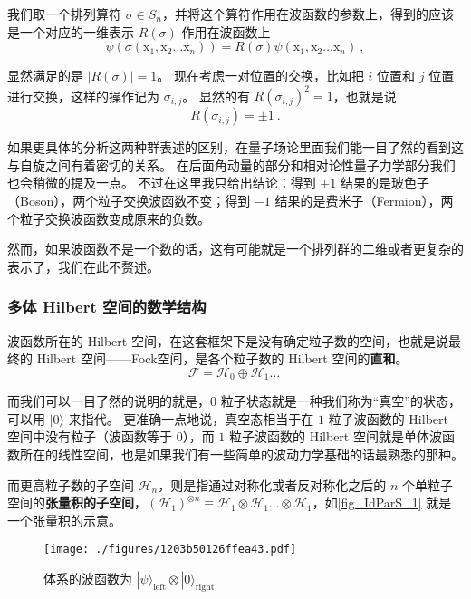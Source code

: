 我们取一个排列算符 $\sigma\in S_n$，并将这个算符作用在波函数的参数上，得到的应该是一个对应的一维表示 $R(\sigma)$ 作用在波函数上
\begin{equation}
\psi(\sigma ({\mathrm x}_1, {\mathrm x}_2\dots{\mathrm x}_n)) = R(\sigma)\psi({\mathrm x}_1, {\mathrm x}_2\dots{\mathrm x}_n)~,
\end{equation}

显然满足的是 $|R(\sigma)| = 1$。 现在考虑一对位置的交换，比如把 $i$ 位置和 $j$ 位置进行交换，这样的操作记为 $\sigma_{i,j}$。 显然的有 $R(\sigma_{i,j})^2 = 1$，也就是说
\begin{equation}
R(\sigma_{i,j}) = \pm 1~.
\end{equation}

如果更具体的分析这两种群表述的区别，在量子场论里面我们能一目了然的看到这与自旋之间有着密切的关系。 在后面角动量的部分和相对论性量子力学部分我们也会稍微的提及一点。 不过在这里我只给出结论：得到 $+1$ 结果的是玻色子（Boson），两个粒子交换波函数不变；得到 $-1$ 结果的是费米子（Fermion），两个粒子交换波函数变成原来的负数。

然而，如果波函数不是一个数的话，这有可能就是一个排列群的二维或者更复杂的表示了，我们在此不赘述。

\subsubsection{多体 Hilbert 空间的数学结构}

波函数所在的 Hilbert 空间，在这套框架下是没有确定粒子数的空间，也就是说最终的 Hilbert 空间——Fock空间，是各个粒子数的 Hilbert 空间的\textbf{直和}。
\begin{equation}
\mathcal{F} = \mathcal{H}_0 \oplus \mathcal{H}_1\dots~
\end{equation}

而我们可以一目了然的说明的就是，$0$ 粒子状态就是一种我们称为“真空”的状态，可以用 $|0\rangle$ 来指代。 更准确一点地说，真空态相当于在 $1$ 粒子波函数的 Hilbert 空间中没有粒子（波函数等于 $0$），而 $1$ 粒子波函数的 Hilbert 空间就是单体波函数所在的线性空间，也是如果我们有一些简单的波动力学基础的话最熟悉的那种。

而更高粒子数的子空间 $\mathcal{H}_n$，则是指通过对称化或者反对称化之后的 $n$ 个单粒子空间的\textbf{张量积的子空间}，$(\mathcal{H}_1)^{\otimes n} \equiv \mathcal{H}_1\otimes \mathcal{H}_1\dots\otimes\mathcal{H}_1$，如\autoref{fig_IdParS_1} 就是一个张量积的示意。

\begin{figure}[ht]
\centering
\texttt{[image: ./figures/1203b50126ffea43.pdf]}
\caption{体系的波函数为 $|\psi\rangle_\text{left}\otimes|0\rangle_\text{right}$} \label{fig_IdParS_1}
\end{figure}

